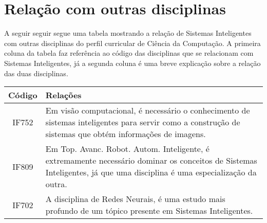 \documentclass{article}
\begin{document}
    

\section{Relação com outras disciplinas}
    A seguir seguir segue uma tabela mostrando a relação de Sistemas Inteligentes com outras disciplinas do perfil curricular de Ciência da Computação. A primeira coluna da tabela faz referência ao código das disciplinas que se relacionam com Sistemas Inteligentes, já a segunda coluna é uma breve explicação sobre a relação das duas disciplinas.
    \begin{center}
    \begin{tabular}{|c|p{10cm}|}
        \hline
        Código & Relações \\ \hline
        IF752 & Em visão computacional, é necessário o conhecimento de sistemas inteligentes para servir como a construção de sistemas que obtém informações de imagens. \\ \hline
        IF809 & Em Top. Avanc. Robot. Autom. Inteligente, é extremamente necessário dominar os conceitos de Sistemas Inteligentes, já que uma disciplina é uma especialização da outra. \\ \hline
        IF702 & A disciplina de Redes Neurais, é uma estudo mais profundo de um tópico presente em  Sistemas Inteligentes.\\ \hline
        
    \end{tabular}
    \end{center}



\end{document}

